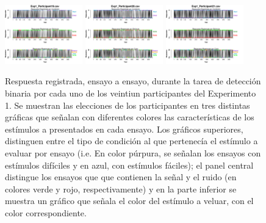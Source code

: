 \begin{figure}[th]
\includegraphics[width=0.30\textwidth]{Figures/BiasResp_Exp1_P19} \includegraphics[width=0.30\textwidth]{Figures/BiasResp_Exp1_P20} \includegraphics[width=0.30\textwidth]{Figures/BiasResp_Exp1_P21}
\caption[Respuesta binaria registrada ensayo a ensayo en relación con el tipo de estímulo a evaluar; Experimento 1]{Respuesta registrada, ensayo a ensayo, durante la tarea de detección binaria por cada uno de los veintiun participantes del Experimento 1. Se muestran las elecciones de los participantes en tres distintas gráficas que señalan con diferentes colores las características de los estímulos a presentados en cada ensayo. Los gráficos superiores, distinguen entre el tipo de condición al que pertenecía el estímulo a evaluar por ensayo (i.e. En color púrpura, se señalan los ensayos con estímulos difíciles y en azul, con estímulos fáciles); el panel central distingue los ensayos que que contienen la señal y el ruido (en colores verde y rojo, respectivamente) y en la parte inferior se muestra un gráfico que señala el color del estímulo a veluar, con el color correspondiente.}
\label{fig:BiasResp_E1}
\end{figure}

